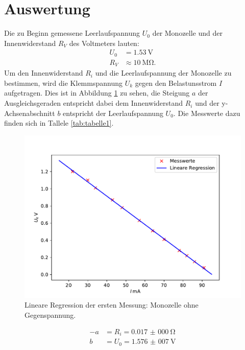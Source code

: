 \section{Auswertung}
Die zu Beginn gemessene Leerlaufspannung $U_{0}$ der Monozelle und der
Innenwiderstand $R_{V}$ des Voltmeters lauten:
\begin{align*}
  U_{0} &= \SI{1,53}{\volt} \\
  R_{V} &\approx \SI{10}{\Mohm}.
\end{align*}
\noindent Um den Innenwiderstand $R_{i}$ und die Leerlaufspannung der Monozelle zu
bestimmen, wird die Klemmspannung $U_{k}$ gegen den Belastunsstrom $I$ aufgetragen.
Dies ist in Abbildung \ref{fig:plot1} zu sehen, die Steigung $a$ der Ausgleichsgeraden
entspricht dabei dem Innenwiderstand $R_{i}$ und der y-Achsenabschnitt $b$ entspricht
der Leerlaufspannung $U_{0}$.
Die Messwerte dazu finden sich in Tallele \ref{tab:tabelle1}.

\begin{figure}[H]
  \centering
  \includegraphics{plot1.pdf}
  \caption{Lineare Regression der ersten Messung: Monozelle ohne Gegenspannung.}
  \label{fig:plot1}
\end{figure}

\begin{align*}
  -a &= R_{i} = \SI{0,017(000)}{\ohm} \\
  b &= U_{0} = \SI{1,576(007)}{\volt}
\end{align*}

